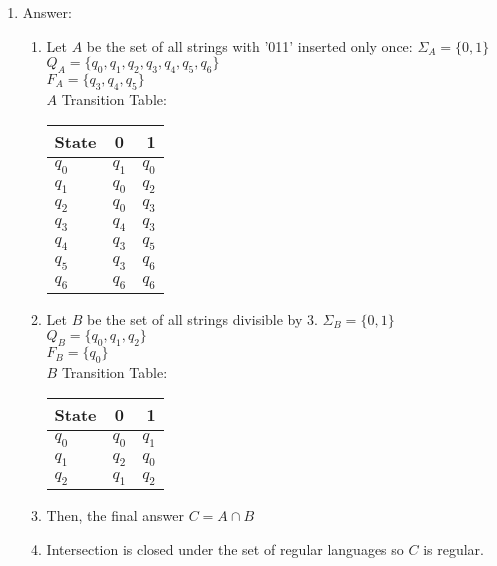 \documentclass{article}
\begin{document}
\begin{enumerate}
    \item Answer: 
      \begin{enumerate}
        \item Let $A$ be the set of all strings with '011' inserted only once:
          $\Sigma_A = \{0,1\}$\\
          $Q_A = \{q_0, q_1, q_2, q_3, q_4, q_5, q_6\}$\\
          $F_A = \{q_3, q_4, q_5\}$\\
          $A$ Transition Table:\\
          \begin{tabular}{ l | c | r }
            State & 0 & 1 \\ \hline
            $q_0$ & $q_1$ & $q_0$ \\

            $q_1$ & $q_0$ & $q_2$ \\

            $q_2$ & $q_0$ & $q_3$ \\

            $q_3$ & $q_4$ & $q_3$ \\

            $q_4$ & $q_3$ & $q_5$ \\

            $q_5$ & $q_3$ & $q_6$ \\

            $q_6$ & $q_6$ & $q_6$ \\
          \end{tabular}
        \item Let $B$ be the set of all strings divisible by 3.
          $\Sigma_B = \{0,1\}$\\
          $Q_B = \{q_0, q_1, q_2\}$\\
          $F_B = \{q_0\}$\\
          $B$ Transition Table:\\
          \begin{tabular}{ l | c | r }
            State & 0 & 1 \\ \hline
            $q_0$ & $q_0$ & $q_1$ \\

            $q_1$ & $q_2$ & $q_0$ \\

            $q_2$ & $q_1$ & $q_2$ \\
          \end{tabular}
        \item Then, the final answer $C = A \cap B$
        \item Intersection is closed under the set of regular languages so $C$ is regular.
      \end{enumerate}
  \end{enumerate}
\end{document}
